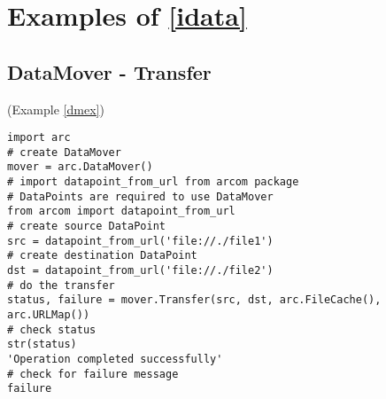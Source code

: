 \section{Examples of \ref{idata}}
\subsection{DataMover - Transfer}
(Example \ref{dmex})
\label{cdmex}
\begin{verbatim}
import arc
# create DataMover
mover = arc.DataMover()
# import datapoint_from_url from arcom package
# DataPoints are required to use DataMover
from arcom import datapoint_from_url
# create source DataPoint
src = datapoint_from_url('file://./file1')
# create destination DataPoint
dst = datapoint_from_url('file://./file2')
# do the transfer
status, failure = mover.Transfer(src, dst, arc.FileCache(), arc.URLMap())
# check status
str(status)
'Operation completed successfully'
# check for failure message
failure
\end{verbatim}

